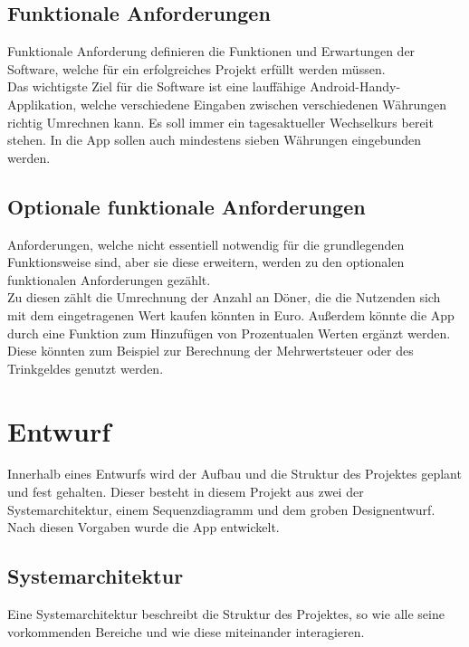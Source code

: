 \documentclass[conference]{IEEEtran}
\begin{document}
\subsection{Funktionale Anforderungen}
Funktionale Anforderung definieren die Funktionen und Erwartungen der Software, welche für ein erfolgreiches Projekt erfüllt werden müssen. \\
Das wichtigste Ziel für die Software ist eine lauffähige Android-Handy-Applikation, welche verschiedene Eingaben zwischen verschiedenen Währungen richtig Umrechnen kann. Es soll immer ein tagesaktueller Wechselkurs bereit stehen. In die App sollen auch mindestens sieben Währungen eingebunden werden.

\subsection{Optionale funktionale Anforderungen}
Anforderungen, welche nicht essentiell notwendig für die grundlegenden Funktionsweise sind, aber sie diese erweitern, werden zu den optionalen funktionalen Anforderungen gezählt. \\
Zu diesen zählt die Umrechnung der Anzahl an Döner, die die Nutzenden sich mit dem eingetragenen Wert kaufen könnten in Euro. Außerdem könnte die App durch eine Funktion zum Hinzufügen von Prozentualen Werten ergänzt werden. Diese könnten zum Beispiel zur Berechnung der Mehrwertsteuer oder des Trinkgeldes genutzt werden.

\section{Entwurf}
Innerhalb eines Entwurfs wird der Aufbau und die Struktur des Projektes geplant und fest gehalten. Dieser besteht in diesem Projekt aus zwei der Systemarchitektur, einem Sequenzdiagramm und dem groben Designentwurf. Nach diesen Vorgaben wurde die App entwickelt.

\subsection{Systemarchitektur}
Eine Systemarchitektur beschreibt die Struktur des Projektes, so wie alle seine vorkommenden Bereiche und wie diese miteinander interagieren. 
\end{document}
